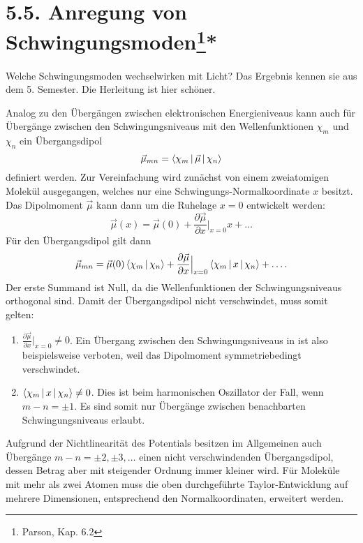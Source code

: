 \section{5.5. Anregung von Schwingungsmoden\protect\footnote{Parson, Kap. 6.2}\hfill **} 

Welche Schwingungsmoden wechselwirken mit  Licht? Das
Ergebnis kennen sie aus dem 5. Semester. Die Herleitung ist
hier schöner.

Analog zu den Übergängen zwischen elektronischen Energieniveaus kann auch für Übergänge zwischen den Schwingungsniveaus mit den Wellenfunktionen $\chi_{m}$ und $\chi_{n}$ ein Übergangsdipol
\begin{equation}
    \vec{\mu}_{mn} = \Braket{\chi_{m} | \vec{\mu} | \chi_{n}}
\end{equation}
definiert werden. Zur Vereinfachung wird zunächst von einem zweiatomigen Molekül ausgegangen, welches nur eine Schwingungs-Normalkoordinate $x$ besitzt. Das Dipolmoment $\vec{\mu}$ kann dann um die Ruhelage $x = 0$ entwickelt werden:
\begin{equation}
    \vec{\mu}(x) = \vec{\mu}(0) + \frac{\partial \vec{\mu}}{\partial x}\Bigr|_{x=0} x + \dots
\end{equation}
Für den Übergangsdipol gilt dann
\begin{equation}
    \vec{\mu}_{mn} = \vec{\mu}(0) \Braket{\chi_{m} | \chi_{n}} + \frac{\partial \vec{\mu}}{\partial x}\Bigr|_{x=0} \Braket{\chi_{m} | x | \chi_{n}} + \dots .
\end{equation}
Der erste Summand ist Null, da die Wellenfunktionen der Schwingungsniveaus orthogonal sind. Damit der Übergangsdipol nicht verschwindet, muss somit gelten:
\begin{enumerate}
    \item $\frac{\partial \vec{\mu}}{\partial x}\Bigr|_{x=0} \neq 0$. Ein Übergang zwischen den Schwingungsniveaus in  ist also beispielsweise verboten, weil das Dipolmoment symmetriebedingt verschwindet.
    \item $\Braket{\chi_{m} | x | \chi_{n}} \neq 0$. Dies ist beim harmonischen Oszillator der Fall, wenn $m - n = \pm 1$. Es sind somit nur Übergänge zwischen benachbarten Schwingungsniveaus erlaubt.
\end{enumerate}
Aufgrund der Nichtlinearität des Potentials besitzen im Allgemeinen auch Übergänge $m - n = \pm 2, \pm 3, \dots$ einen nicht verschwindenden Übergangsdipol, dessen Betrag aber mit steigender Ordnung immer kleiner wird. Für Moleküle mit mehr als zwei Atomen muss die oben durchgeführte Taylor-Entwicklung auf mehrere Dimensionen, entsprechend den Normalkoordinaten, erweitert werden.




\printbibliography[segment=\therefsegment,heading=subbibliography]
